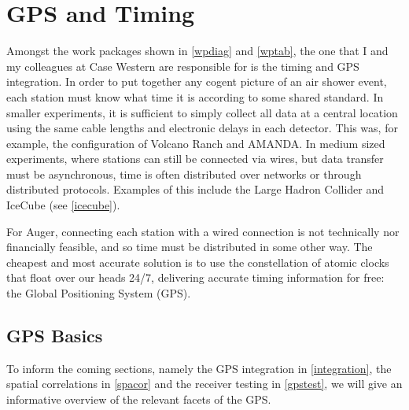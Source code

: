 \section{GPS and Timing}
Amongst the work packages shown in \autoref{wpdiag} and \autoref{wptab}, the one that I and my colleagues at Case Western are responsible for is the timing and GPS integration. In order to put together any cogent picture of an air shower event, each station must know what time it is according to some shared standard. In smaller experiments, it is sufficient to simply collect all data at a central location using the same cable lengths and electronic delays in each detector. This was, for example, the configuration of Volcano Ranch and AMANDA. In medium sized experiments, where stations can still be connected via wires, but data transfer must be asynchronous, time is often distributed over networks or through distributed protocols. Examples of this include the Large Hadron Collider and IceCube (see \autoref{icecube}). 

For Auger, connecting each station with a wired connection is not technically nor financially feasible, and so time must be distributed in some other way. The cheapest and most accurate solution is to use the constellation of atomic clocks that float over our heads 24/7, delivering accurate timing information for free: the Global Positioning System (GPS). 
\subsection{GPS Basics}
\label{gps}
To inform the coming sections, namely the GPS integration in \autoref{integration}, the spatial correlations in \autoref{spacor} and the receiver testing in \autoref{gpstest}, we will give an informative overview of the relevant facets of the GPS.

